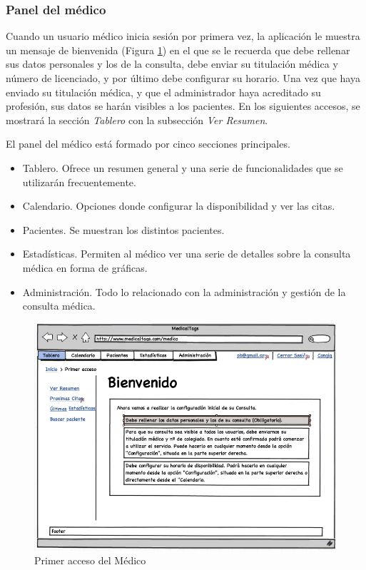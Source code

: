 	
	\subsubsection{Panel del médico} %
		\label{sub:panel_medico}
		
		Cuando un usuario médico inicia sesión por primera vez, la aplicación le muestra un mensaje de bienvenida (Figura \ref{fig:iu_tablero_medico_inicial}) en el que se le recuerda que debe rellenar sus datos personales y los de la consulta, debe enviar su titulación médica y número de licenciado, y por último debe configurar su horario. Una vez que haya enviado su titulación médica, y que el administrador haya acreditado su profesión, sus datos se harán visibles a los pacientes. En los siguientes accesos, se mostrará la sección \textit{Tablero} con la subsección \textit{Ver Resumen}.		
	
		El panel del médico está formado por cinco secciones principales.
		\begin{itemize}
			\item Tablero. Ofrece un resumen general y una serie de funcionalidades que se utilizarán frecuentemente.
			\item Calendario. Opciones donde configurar la disponibilidad y ver las citas.
			\item Pacientes. Se muestran los distintos pacientes.
			\item Estadísticas. Permiten al médico ver una serie de detalles sobre la consulta médica en forma de gráficas.
			\item Administración. Todo lo relacionado con la administración y gestión de la consulta médica.
		\end{itemize}
		
		\begin{figure}[H]
		  \centering
		    \includegraphics[width=12cm]{img/png/interfaz/7_Dashboar_Medico_Inicial.png}
		  \caption{Primer acceso del Médico}
		  \label{fig:iu_tablero_medico_inicial}
		\end{figure}
	
